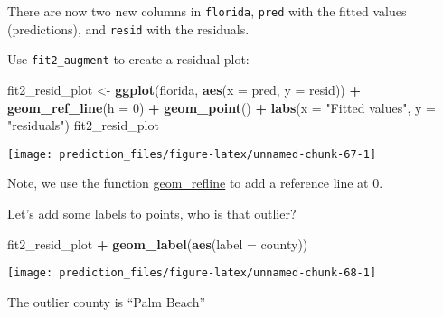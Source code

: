\documentclass[]{book}
\newenvironment{Shaded}{\begin{snugshade}}{\end{snugshade}}
\newcommand{\KeywordTok}[1]{\textcolor[rgb]{0.13,0.29,0.53}{\textbf{#1}}}
\newcommand{\DataTypeTok}[1]{\textcolor[rgb]{0.13,0.29,0.53}{#1}}
\newcommand{\DecValTok}[1]{\textcolor[rgb]{0.00,0.00,0.81}{#1}}
\newcommand{\StringTok}[1]{\textcolor[rgb]{0.31,0.60,0.02}{#1}}
\newcommand{\CommentTok}[1]{\textcolor[rgb]{0.56,0.35,0.01}{\textit{#1}}}
\newcommand{\OperatorTok}[1]{\textcolor[rgb]{0.81,0.36,0.00}{\textbf{#1}}}
\newcommand{\NormalTok}[1]{#1}
\theoremstyle{definition}
\theoremstyle{definition}
\theoremstyle{definition}
\theoremstyle{remark}
\begin{document}
There are now two new columns in \texttt{florida}, \texttt{pred} with
the fitted values (predictions), and \texttt{resid} with the residuals.

Use \texttt{fit2\_augment} to create a residual plot:

\begin{Shaded}
\begin{Highlighting}[]
\NormalTok{fit2_resid_plot <-}
\StringTok{  }\KeywordTok{ggplot}\NormalTok{(florida, }\KeywordTok{aes}\NormalTok{(}\DataTypeTok{x =}\NormalTok{ pred, }\DataTypeTok{y =}\NormalTok{ resid)) }\OperatorTok{+}
\StringTok{  }\KeywordTok{geom_ref_line}\NormalTok{(}\DataTypeTok{h =} \DecValTok{0}\NormalTok{) }\OperatorTok{+}
\StringTok{  }\KeywordTok{geom_point}\NormalTok{() }\OperatorTok{+}
\StringTok{  }\KeywordTok{labs}\NormalTok{(}\DataTypeTok{x =} \StringTok{"Fitted values"}\NormalTok{, }\DataTypeTok{y =} \StringTok{"residuals"}\NormalTok{)}
\NormalTok{fit2_resid_plot}
\end{Highlighting}
\end{Shaded}

\begin{center}\texttt{[image: prediction\_files/figure-latex/unnamed-chunk-67-1]} \end{center}

Note, we use the function
\href{https://www.rdocumentation.org/packages/modelr/topics/geom_refline}{geom\_refline}
to add a reference line at 0.

Let's add some labels to points, who is that outlier?

\begin{Shaded}
\begin{Highlighting}[]
\NormalTok{fit2_resid_plot }\OperatorTok{+}
\StringTok{  }\KeywordTok{geom_label}\NormalTok{(}\KeywordTok{aes}\NormalTok{(}\DataTypeTok{label =}\NormalTok{ county))}
\end{Highlighting}
\end{Shaded}

\begin{center}\texttt{[image: prediction\_files/figure-latex/unnamed-chunk-68-1]} \end{center}

The outlier county is ``Palm Beach''

\begin{Shaded}
\end{Shaded}
\end{document}
